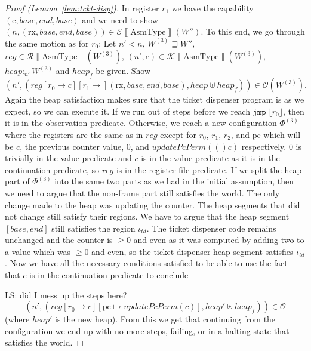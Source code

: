 \documentclass{article}
\newcommand{\update}[2]{[#1 \mapsto #2]}
\newcommand{\sem}[1]{\left\llbracket #1 \right\rrbracket}
\newcommand\lau[1]{{\color{purple} \sf \footnotesize {LS: #1}}}
\newcommand{\var}[1]{\mathit{#1}}
\newcommand{\pcreg}{\mathrm{pc}}
\newcommand{\reg}{\var{reg}}
\newcommand{\heap}{\var{heap}}
\newcommand{\plainfun}[1]{\mathit{#1}}
\newcommand{\updatePcPerm}[1]{\plainfun{updatePcPerm}(#1)}
\newcommand{\future}{\mathbin{\sqsupseteq}}
\newcommand{\heapSat}[3][\heap]{#1 :_{#2} #3}
\newcommand{\asmType}{\plaindom{AsmType}}
\newcommand{\plaindom}[1]{\mathrm{#1}}
\newcommand{\intr}[2]{\mathcal{#1}\sem{#2}}
\newcommand{\exprintr}[1]{\intr{E}{#1}}
\newcommand{\contintr}[1]{\intr{K}{#1}}
\newcommand{\regintr}[1]{\intr{R}{#1}}
\newcommand{\stder}{\exprintr{\asmType}}
\newcommand{\stdrr}{\regintr{\asmType}}
\newcommand{\stdkr}{\contintr{\asmType}}
\newcommand{\observations}{\mathcal{O}}
\newcommand{\npair}[2][n]{\left(#1,#2 \right)}
\newcommand{\refreg}[1]{\lfloor #1 \rfloor}
\newcommand{\instr}[1]{\mathtt{#1}}
\newcommand{\oneinstr}[2]{\instr{#1} \; #2}
\newcommand{\jmp}[1]{\oneinstr{jmp}{#1}}
\newcommand{\plainperm}[1]{\mathrm{#1}}
\newcommand{\exec}{\plainperm{rx}}
\newcommand{\entry}{\plainperm{e}}
\begin{document}
\begin{proof}[Proof (Lemma~\ref{lem:tckt-disp})]
In register $r_1$ we have the capability $(\entry,\var{base},\var{end},\var{base})$ and we need to show $\npair[n]{(\exec,\var{base},\var{end},\var{base})} \in \stder(W'')$. To this end, we go through the same motion as for $r_0$:  Let $n' < n$, $W^{(3)} \future W''$, $\reg \in \stdrr(W^{(3)})$, $\npair[n']{c} \in \stdkr(W^{(3)})$, $\heapSat[\heap]{n'}{W^{(3)}}$ and $\heap_f$ be given. Show 
\[
\npair[n']{(\reg[r_0 \mapsto c][r_1 \mapsto ](\exec,\var{base},\var{end},\var{base}), \heap \uplus \heap_f)} \in \observations(W^{(3)}).
\]
Again the heap satisfaction makes sure that the ticket dispenser program is as we expect, so we can execute it. If we run out of steps before we reach $\jmp{\refreg{r_0}}$, then it is in the observation predicate. Otherwise, we reach a new configuration $\Phi^{(3)}$ where the registers are the same as in $\reg$ except for $r_0$, $r_1$, $r_2$, and $\pcreg$ which will be $c$, the previous counter value, $0$, and $\updatePcPerm(c)$ respectively. $0$ is trivially in the value predicate and $c$ is in the value predicate as it is in the continuation predicate, so $\reg$ is in the register-file predicate. If we split the heap part of $\Phi^{(3)}$ into the same two parts as we had in the initial assumption, then we need to argue that the non-frame part still satisfies the world. The only change made to the heap was updating the counter. The heap segments that did not change still satisfy their regions. We have to argue that the heap segment $[\var{base},\var{end}]$ still satisfies the region $\iota_{\var{td}}$. The ticket dispenser code remains unchanged and the counter is $\geq 0$ and even as it was computed by adding two to a value which was $\geq 0$ and even, so the ticket dispenser heap segment satisfies $\iota_{\var{td}}$. Now we have all the necessary conditions satisfied to be able to use the fact that $c$ is in the continuation predicate to conclude 

\lau{did I mess up the steps here?}
\[
\npair[n']{(\reg\update{r_0}{c}\update{\pcreg}{\updatePcPerm{c}}, \heap' \uplus \heap_f)} \in \observations
\]
(where $\heap'$ is the new heap). From this we get that continuing from the configuration we end up with no more steps, failing, or in a halting state that satisfies the world.



\end{proof}
\end{document}

